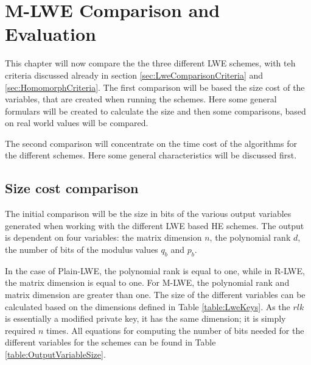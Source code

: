 \chapter{M-LWE Comparison and Evaluation}

This chapter will now compare the the three different LWE schemes, with teh criteria discussed already in section \ref{sec:LweComparisonCriteria} and \ref{sec:HomomorphCriteria}. The first comparison will be based the size cost of the variables, that are created when running the schemes. Here some general formulars will be created to calculate the size and then some comparisons, based on real world values will be compared.

The second comparison will concentrate on the time cost of the algorithms for the different schemes. Here some general characteristics will be discussed first. 

\section{Size cost comparison}

The initial comparison will be the size in bits of the various output variables generated when working with the different LWE based HE schemes. The output is dependent on four variables: the matrix dimension $n$, the polynomial rank $d$, the number of bits of the modulus values $q_b$ and $p_b$.

In the case of Plain-LWE, the polynomial rank is equal to one, while in R-LWE, the matrix dimension is equal to one. For M-LWE, the polynomial rank and matrix dimension are greater than one. The size of the different variables can be calculated based on the dimensions defined in Table \ref{table:LweKeys}. As the $rlk$ is essentially a modified private key, it has the same dimension; it is simply required $n$ times. All equations for computing the number of bits needed for the different variables for the schemes can be found in Table \ref{table:OutputVariableSize}. 


